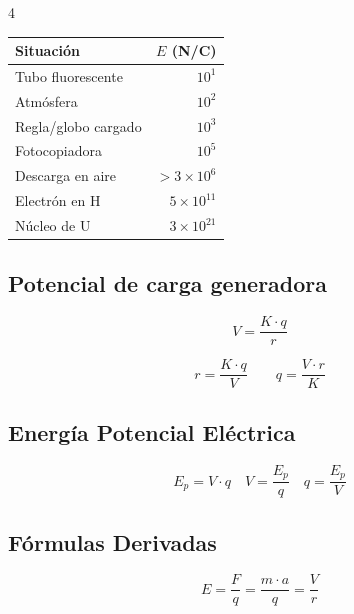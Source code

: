 \documentclass[9pt, landscape, letterpaper]{extarticle}
\begin{document}
\begin{multicols}{4}
  \begin{tablabox}
    \tablacompacta
    \begin{tabular}{@{}p{3.2cm}r@{}}
      \toprule
      Situación           & $E$ (N/C)          \\
      \midrule
      Tubo fluorescente   & $10^1$             \\
      Atmósfera           & $10^2$             \\
      Regla/globo cargado & $10^3$             \\
      Fotocopiadora       & $10^5$             \\
      Descarga en aire    & $> 3 \times 10^6$  \\
      Electrón en H       & $5 \times 10^{11}$ \\
      Núcleo de U         & $3 \times 10^{21}$ \\
      \bottomrule
    \end{tabular}
  \end{tablabox}

  \subsection{Potencial de carga generadora}

  \begin{formulabox}
    $$V = \frac{K \cdot q}{r}$$
  \end{formulabox}

  \begin{despejesbox}[Despejes]
    $$r = \frac{K \cdot q}{V} \qquad q = \frac{V \cdot r}{K}$$
  \end{despejesbox}

  \subsection{Energía Potencial Eléctrica}

  \begin{formulabox}
    $$E_p = V \cdot q \quad V = \frac{E_p}{q} \quad q = \frac{E_p}{V}$$
  \end{formulabox}

  \subsection{Fórmulas Derivadas}

  \begin{despejesbox}
    $$E = \frac{F}{q} = \frac{m \cdot a}{q} = \frac{V}{r}$$
  \end{despejesbox}


\end{multicols}
\end{document}
